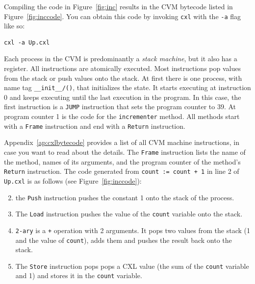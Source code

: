 \documentclass{report}
\newenvironment{code}{
\tcolorbox
}{
\endtcolorbox
}
\begin{document}
Compiling the code in Figure~\ref{fig:inc} results in the CVM bytecode
listed in Figure~\ref{fig:inccode}.
You can obtain this code by invoking \texttt{cxl} with the \texttt{-a} flag
like so:
\begin{code}
\begin{verbatim}
cxl -a Up.cxl
\end{verbatim}
\end{code}
Each process in the CVM is predominantly a \emph{stack machine},
but it also has a register.
All instructions are atomically executed.
Most instructions pop values from the stack or push values onto the stack.
At first there is one process, with name tag \texttt{\_\_init\_\_/()},
that initializes the state.
It starts executing at instruction 0 and keeps executing until the last
execution in the program.
In this case, the first instruction is a \texttt{JUMP} instruction that sets the
program counter to 39.
At program counter 1 is the code for the \texttt{incrementer} method.
All methods start with a \texttt{Frame} instruction and end with a \texttt{Return}
instruction.

Appendix~\ref{ap:cxlbytecode} provides a list of all CVM machine instructions,
in case you want to read about the details.
The \texttt{Frame} instruction lists the name of the method,
names of its arguments, and
the program counter of the method's \texttt{Return} instruction.
The code generated from \texttt{count := count + 1} in line 2 of
\texttt{Up.cxl} is as follows (see Figure~\ref{fig:inccode}):

\begin{enumerate} \setcounter{enumi}{1}
\item the \texttt{Push} instruction pushes the constant 1
onto the stack of the process.
\item The \texttt{Load} instruction pushes the value of the
\texttt{count} variable onto the stack.
\item \texttt{2-ary} is a \texttt{+} operation with 2 arguments.
It pops two values from the stack (1 and the value of \texttt{count}),
adds them and pushes the result back onto the stack.
\item The \texttt{Store} instruction pops pops
a CXL value (the sum of the \texttt{count} variable and 1) and
stores it in the \texttt{count} variable.
\end{enumerate}
\end{document}
